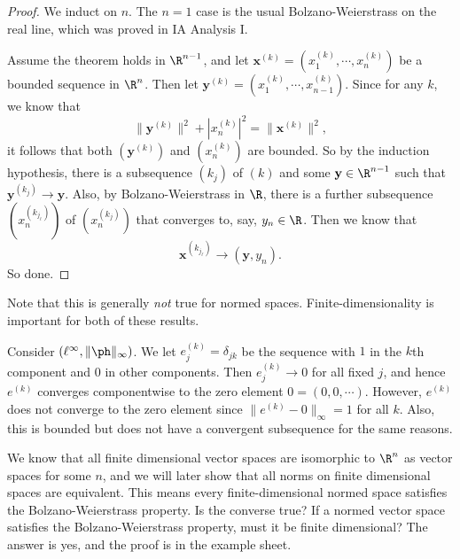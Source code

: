 \documentclass[a4paper]{article}
\begin{document}
\begin{proof}
  We induct on $n$. The $n = 1$ case is the usual Bolzano-Weierstrass on the real line, which was proved in IA Analysis I.

  Assume the theorem holds in $\R^{n - 1}$, and let $\mathbf{x}^{(k)} = (x^{(k)}_1, \cdots, x_n^{(k)})$ be a bounded sequence in $\R^n$. Then let $\mathbf{y}^{(k)} = (x^{(k)}_1, \cdots, x_{n - 1}^{(k)})$. Since for any $k$, we know that
  \[
    \|\mathbf{y}^{(k)}\|^2 + |x_n^{(k)}|^2 = \|\mathbf{x}^{(k)}\|^2,
  \]
  it follows that both $(\mathbf{y}^{(k)})$ and $(x_n^{(k)})$ are bounded. So by the induction hypothesis, there is a subsequence $(k_j)$ of $(k)$ and some $\mathbf{y} \in \R^{n - 1}$ such that $\mathbf{y}^{(k_j)} \to \mathbf{y}$. Also, by Bolzano-Weierstrass in $\R$, there is a further subsequence $(x_n^{(k_{j_\ell})})$ of $(x_n^{(k_j)})$ that converges to, say, $y_n \in \R$. Then we know that
  \[
    \mathbf{x}^{(k_{j_\ell})} \to (\mathbf{y}, y_n).
  \]
  So done.
\end{proof}

Note that this is generally \emph{not} true for normed spaces. Finite-dimensionality is important for both of these results.

\begin{eg}
  Consider $(\ell^\infty, \|\ph\|_\infty)$. We let $e^{(k)}_j = \delta_{jk}$ be the sequence with $1$ in the $k$th component and $0$ in other components. Then $e_j^{(k)} \to 0$ for all fixed $j$, and hence $e^{(k)}$ converges componentwise to the zero element $0 = (0, 0, \cdots)$. However, $e^{(k)}$ does not converge to the zero element since $\|e^{(k)} - 0\|_\infty = 1$ for all $k$. Also, this is bounded but does not have a convergent subsequence for the same reasons.
\end{eg}

We know that all finite dimensional vector spaces are isomorphic to $\R^n$ as vector spaces for some $n$, and we will later show that all norms on finite dimensional spaces are equivalent. This means every finite-dimensional normed space satisfies the Bolzano-Weierstrass property. Is the converse true? If a normed vector space satisfies the Bolzano-Weierstrass property, must it be finite dimensional? The answer is yes, and the proof is in the example sheet.
\end{document}
